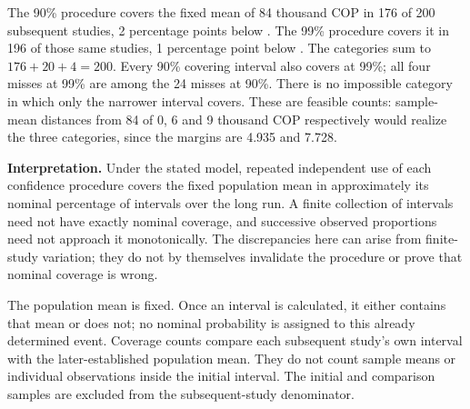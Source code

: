 


The 90\% procedure covers the fixed mean of 84 thousand COP in 176 of 200 subsequent studies, 2 percentage points below . The 99\% procedure covers it in 196 of those same studies, 1 percentage point below . The categories sum to $176+20+4=200$. Every 90\% covering interval also covers at 99\%; all four misses at 99\% are among the 24 misses at 90\%. There is no impossible category in which only the narrower interval covers. These are feasible counts: sample-mean distances from 84 of 0, 6 and 9 thousand COP respectively would realize the three categories, since the margins are 4.935 and 7.728.

\textbf{Interpretation.} Under the stated model, repeated independent use of each confidence procedure covers the fixed population mean in approximately its nominal percentage of intervals over the long run. A finite collection of intervals need not have exactly nominal coverage, and successive observed proportions need not approach it monotonically. The discrepancies here can arise from finite-study variation; they do not by themselves invalidate the procedure or prove that nominal coverage is wrong.

The population mean is fixed. Once an interval is calculated, it either contains that mean or does not; no nominal probability is assigned to this already determined event. Coverage counts compare each subsequent study's own interval with the later-established population mean. They do not count sample means or individual observations inside the initial interval. The initial and comparison samples are excluded from the subsequent-study denominator.

